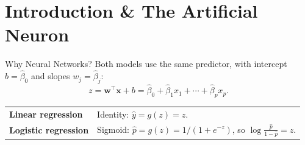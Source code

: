 

\section{Introduction \& The Artificial Neuron}

\begin{frame}{Why Neural Networks?}
    \small
    Both models use the same predictor, with intercept $b=\hat\beta_0$ and slopes $w_j=\hat\beta_j$:
    \[
        z = \mathbf{w}^{\top}\mathbf{x}+b
          = \hat\beta_0+\hat\beta_1 x_1+\cdots+\hat\beta_p x_p.
    \]
    \begin{tabular}{@{}ll@{}}
        \textbf{Linear regression} & Identity: $\hat y=g(z)=z$. \\
        \textbf{Logistic regression} & Sigmoid: $\hat p=g(z)=1/(1+e^{-z})$, so $\log\!\frac{\hat p}{1-\hat p}=z$.

\end{tabular}
\end{frame}
